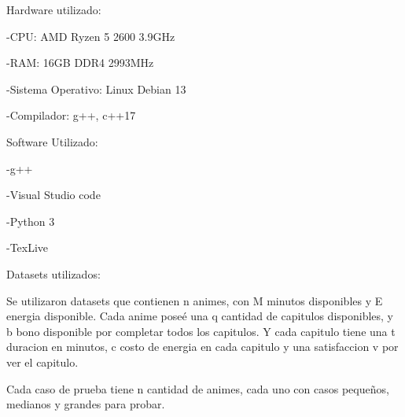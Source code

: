 Hardware utilizado:

-CPU: AMD Ryzen 5 2600 3.9GHz

-RAM: 16GB DDR4 2993MHz

-Sistema Operativo: Linux Debian 13

-Compilador: g++, c++17

Software Utilizado:

-g++

-Visual Studio code

-Python 3

-TexLive

Datasets utilizados:

Se utilizaron datasets que contienen n animes, con M minutos disponibles y E energia disponible.
Cada anime poseé una q cantidad de capitulos disponibles, y b bono disponible por completar todos los capitulos.
Y cada capitulo tiene una t duracion en minutos, c costo de energia en cada capitulo y una satisfaccion v por ver el capitulo.

Cada caso de prueba tiene n cantidad de animes, cada uno con casos pequeños, medianos y grandes para probar.
